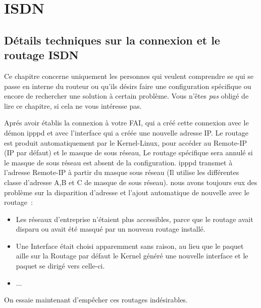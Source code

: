 
\section{ISDN}
{
  \subsection{Détails techniques sur la connexion et le routage ISDN}
}

Ce chapitre concerne uniquement les personnes qui veulent comprendre se 
qui se passe en interne du routeur ou qu'ils désirs faire une configuration 
spécifique ou encore de rechercher une solution à certain problème. Vous 
n'êtes \emph{pas} obligé de lire ce chapitre, si cela ne vous intéresse pas.

Aprés avoir établis la connexion à votre FAI, qui a créé cette connexion avec 
le démon ipppd et avec l'interface qui a créée une nouvelle adresse IP. Le 
routage est produit automatiquement par le Kernel-Linux, pour accéder au 
Remote-IP (IP par défaut) et le masque de sous réseau, Le routage spécifique 
sera annulé si le masque de sous réseau est absent de la configuration. ipppd 
transmet à l'adresse Remote-IP à partir du masque sous réseau (Il utilise les 
différentes classe d'adresse A,B et C de masque de sous réseau). nous avons 
toujours eux des problème sur la disparition d'adresse et l'ajout automatique 
de nouvelle avec le routage~:
\begin{itemize}
\item Les réseaux d'entreprise n'étaient plus accessibles, parce que le routage 
  avait disparu ou avait été masqué par un nouveau routage installé.
\item Une Interface était choisi apparemment sans raison, au lieu que le paquet 
  aille sur la Routage par défaut le Kernel généré une nouvelle interface et le 
  paquet se dirigé vers celle-ci.
\item ...
\end{itemize}

On essaie maintenant d'empêcher ces routages indésirables.


